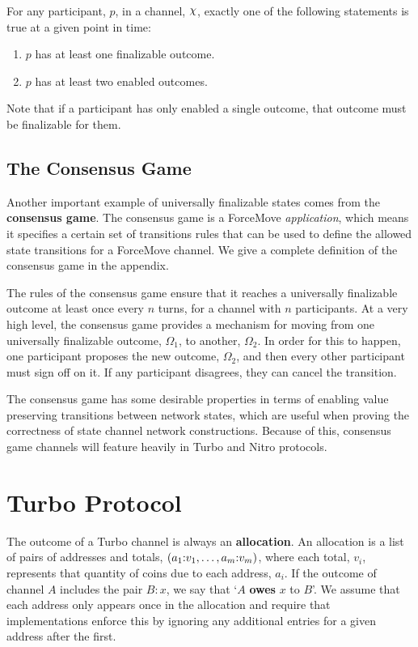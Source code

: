 \documentclass{article}
\begin{document}
For any participant, $p$, in a channel, $\rchi$, exactly one of the following statements is
true at a given point in time:
\begin{enumerate}
  \item $p$ has at least one finalizable outcome.
  \item $p$ has at least two enabled outcomes.
\end{enumerate}
Note that if a participant has only enabled a single outcome, that outcome must be finalizable for them.

\subsection{The Consensus Game}

Another important example of universally finalizable states comes from the \textbf{consensus game}.
The consensus game is a ForceMove \textit{application}, which means it specifies a certain
set of transitions rules that can be used to define the allowed state transitions for a ForceMove
channel.
We give a complete definition of the consensus game in the appendix.

The rules of the consensus game ensure that it reaches a universally finalizable outcome at least once every $n$ turns, for a channel with $n$ participants.
At a very high level, the consensus game provides a mechanism for moving from one universally
finalizable outcome, $\Omega_1$, to another, $\Omega_2$. 
In order for this to happen, one participant proposes the new outcome, $\Omega_2$, and then
every other participant must sign off on it. 
If any participant disagrees, they can cancel the transition.

The consensus game has some desirable properties in terms of enabling value preserving transitions between network states, which are useful when proving the correctness of state channel network constructions.
Because of this, consensus game channels will feature heavily in Turbo and Nitro protocols.

\section{Turbo Protocol}

The outcome of a Turbo channel is always an \textbf{allocation}.
An allocation is a list of pairs of addresses and totals, $( a_1{:}v_1, \dots, a_m{:}v_m )$, where each total, $v_i$, represents that quantity of coins due to each address, $a_i$.
If the outcome of channel $A$ includes the pair $B{:}x$, we say that `$A$ \textbf{owes} $x$ to $B$'.
We assume that each address only appears once in the allocation and require that implementations enforce this by ignoring any additional entries for a given address after the first.
\end{document}
